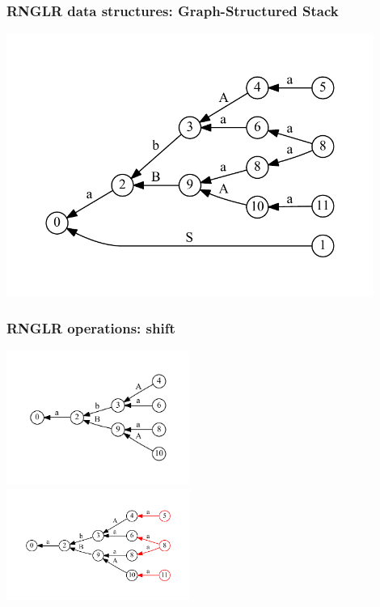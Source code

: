 \documentclass{beamer}
\begin{document}
\begin{frame}
  \transwipe[direction=90]
  \frametitle{RNGLR data structures: Graph-Structured Stack}
  \includegraphics[width=12cm]{pictures/gss_rnglr}
\end{frame}

\begin{frame}
  \transwipe[direction=90]
  \frametitle{RNGLR operations: shift}
  \begin{center}
  \includegraphics[width=6cm]{pictures/gss_rnglr_shift_1} \\
  \includegraphics[width=6cm]{pictures/gss_rnglr_shift_2}
  \end{center}
\end{frame}
\end{document}
